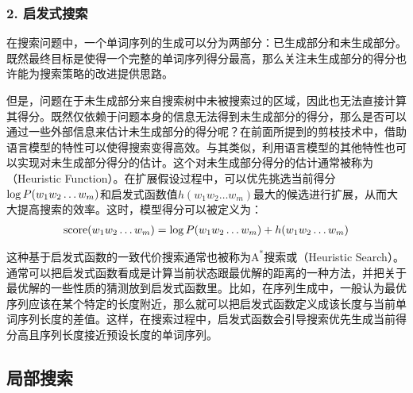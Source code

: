 
\subsubsection{2. 启发式搜索}

\parinterval 在搜索问题中，一个单词序列的生成可以分为两部分：已生成部分和未生成部分。既然最终目标是使得一个完整的单词序列得分最高，那么关注未生成部分的得分也许能为搜索策略的改进提供思路。

\parinterval 但是，问题在于未生成部分来自搜索树中未被搜索过的区域，因此也无法直接计算其得分。既然仅依赖于问题本身的信息无法得到未生成部分的得分，那么是否可以通过一些外部信息来估计未生成部分的得分呢？在前面所提到的剪枝技术中，借助语言模型的特性可以使得搜索变得高效。与其类似，利用语言模型的其他特性也可以实现对未生成部分得分的估计。这个对未生成部分得分的估计通常被称为{\small{}}（Heuristic Function）。在扩展假设过程中，可以优先挑选当前得分$\log {P}(w_1 w_2 \ldots w_m)$和启发式函数值$h(w_1 w_2 \ldots w_m)$最大的候选进行扩展，从而大大提高搜索的效率。这时，模型得分可以被定义为：
\begin{eqnarray}
\textrm{score}(w_1 w_2 \ldots w_m) = \log {P}(w_1 w_2 \ldots w_m) + h(w_1 w_2 \ldots w_m)
\label{eq:2-45}
\end{eqnarray}

\parinterval 这种基于启发式函数的一致代价搜索通常也被称为$\textrm{A}^{\ast}$搜索或{\small{}}（Heuristic Search）。通常可以把启发式函数看成是计算当前状态跟最优解的距离的一种方法，并把关于最优解的一些性质的猜测放到启发式函数里。比如，在序列生成中，一般认为最优序列应该在某个特定的长度附近，那么就可以把启发式函数定义成该长度与当前单词序列长度的差值。这样，在搜索过程中，启发式函数会引导搜索优先生成当前得分高且序列长度接近预设长度的单词序列。


\subsection{局部搜索}

